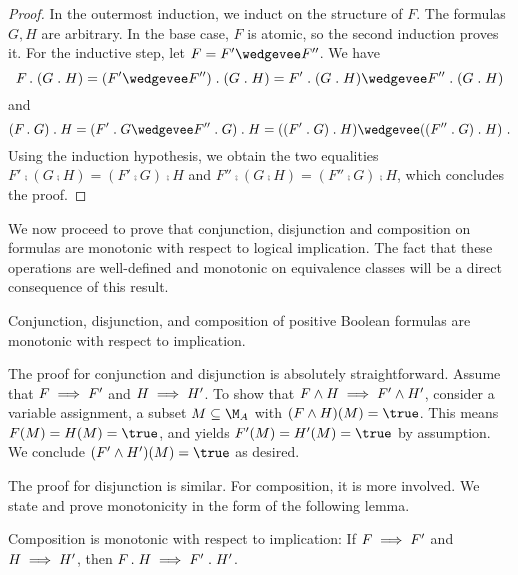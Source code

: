 \documentclass[../../diss.tex]{subfiles}
\begin{document}
\begin{proof}
    In the outermost induction, we induct on the structure of $F$.
    The formulas $G,H$ are arbitrary.
    In the base case, $F$ is atomic, so the second induction proves it.
    For the inductive step, let $F = F' \wedgevee F''$.
    We have
    \[
        F \comp (G \comp H)
        = (F' \wedgevee F'') \comp (G \comp H)
        = F' \comp (G \comp H) \wedgevee F'' \comp (G \comp H)
    \]
    and
    \[
        (F \comp G) \comp H
        = (F' \comp G \wedgevee F'' \comp G) \comp H
        = ((F' \comp G) \comp H) \wedgevee ((F'' \comp G) \comp H)
        \ .
    \]
    Using the induction hypothesis, we obtain the two equalities $F' \comp (G \comp H) = (F' \comp G) \comp H$ and $F'' \comp (G \comp H)= (F'' \comp G) \comp H$, which concludes the proof.
\end{proof}

We now proceed to prove that conjunction, disjunction and composition on formulas are monotonic with respect to logical implication.
The fact that these operations are well-defined and monotonic on equivalence classes will be a direct consequence of this result.

\begin{proposition}%
\label{Proposition:CFGamesCompositionMonot}%
    Conjunction, disjunction, and composition of positive Boolean formulas are monotonic with respect to implication.
\end{proposition}

The proof for conjunction and disjunction is absolutely straightforward.
Assume that $F \implies F'$ and $H \implies H'$.
To show that $F \wedge H \implies F' \wedge H'$, consider a variable assignment, \ie a subset $M \subseteq \nfatransmonoid{A}$ with $(F \wedge H)(M) = \true$.
This means $F(M) = H(M) = \true$, and yields $F'(M) = H'(M) = \true$ by assumption.
We conclude $(F' \wedge H')(M) = \true$ as desired.

The proof for disjunction is similar.
For composition, it is more involved.
We state and prove monotonicity in the form of the following lemma.

\begin{lemma}%
\label{Lemma:CFGamesCompositionMonot}%
    Composition is monotonic with respect to implication: If $F \implies F'$ and $H \implies H'$, then $F \mathrel{.} H \implies F' \mathrel{.} H'$.
\end{lemma}
\end{document}
